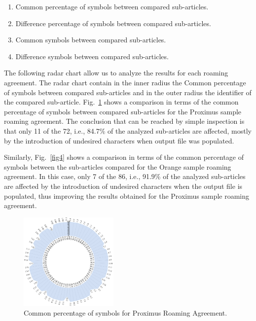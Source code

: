 \documentclass[conference]{style/IEEEtran}
\begin{document}
\begin{enumerate}
\item Common percentage of symbols between compared sub-articles.
\item Difference percentage of symbols between compared sub-articles.
\item Common symbols between compared sub-articles.
\item Difference symbols between compared sub-articles.
\end{enumerate}

The following radar chart allow us to analyze the results for each roaming agreement. The radar chart contain in the inner radius the Common percentage of symbols between compared sub-articles and in the outer radius the identifier of the compared sub-article. Fig.~\ref{fig3} shows a comparison in terms of the common percentage of symbols between compared sub-articles for the Proximus sample roaming agreement. The conclusion that can be reached by simple inspection is that only 11 of the 72, i.e.,  84.7\% of the analyzed sub-articles are affected, mostly by the introduction of undesired characters when output file was populated.

Similarly, Fig.~\ref{fig4} shows a comparison in terms of the common percentage of symbols between the sub-articles compared for the Orange sample roaming agreement. In this case, only 7 of the 86, i.e., 91.9\% of the analyzed sub-articles are affected by the introduction of undesired characters when the output file is populated, thus improving the results obtained for the Proximus sample roaming agreement.

\begin{figure}[htbp]
\centerline{\includegraphics[width=0.43\textwidth]{images/Proximus.png}}
\caption{Common percentage of symbols for Proximus Roaming Agreement.}
\label{fig3}
\end{figure}
\end{document}
